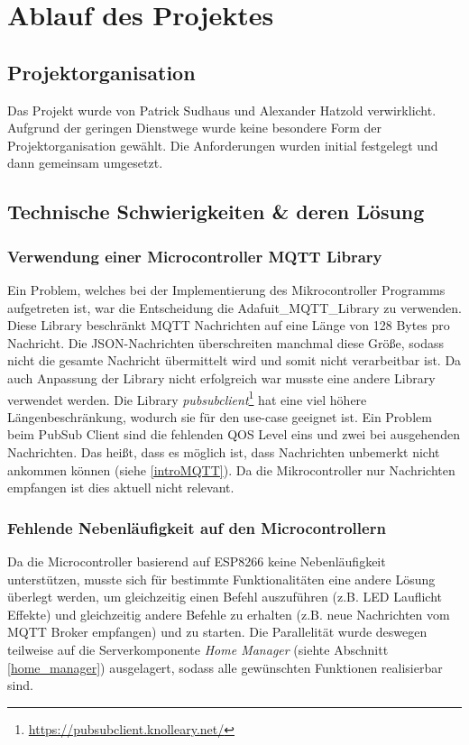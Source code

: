 \chapter{Ablauf des Projektes}

\section{Projektorganisation}
Das Projekt wurde von Patrick Sudhaus und Alexander Hatzold verwirklicht. Aufgrund der geringen Dienstwege wurde keine besondere Form der Projektorganisation gewählt. Die Anforderungen wurden initial festgelegt und dann gemeinsam umgesetzt.

\section{Technische Schwierigkeiten \& deren Lösung}

\subsection{Verwendung einer Microcontroller MQTT Library}
Ein Problem, welches bei der Implementierung des Mikrocontroller Programms aufgetreten ist, war die Entscheidung die Adafuit\_MQTT\_Library zu verwenden. Diese Library beschränkt MQTT Nachrichten auf eine Länge von 128 Bytes pro Nachricht. Die JSON-Nachrichten überschreiten manchmal diese Größe, sodass nicht die gesamte Nachricht übermittelt wird und somit nicht verarbeitbar ist. Da auch Anpassung der Library nicht erfolgreich war musste eine andere Library verwendet werden. Die Library \textit{pubsubclient}\footnote{\url{https://pubsubclient.knolleary.net/}} hat eine viel höhere Längenbeschränkung, wodurch sie für den use-case geeignet ist. Ein Problem beim PubSub Client sind die fehlenden QOS Level eins und zwei bei ausgehenden Nachrichten. Das heißt, dass es möglich ist, dass Nachrichten unbemerkt nicht ankommen können (siehe \ref{introMQTT}). Da die Mikrocontroller nur Nachrichten empfangen ist dies aktuell nicht relevant.

\subsection{Fehlende Nebenläufigkeit auf den Microcontrollern}
Da die Microcontroller basierend auf ESP8266 keine Nebenläufigkeit unterstützen, musste sich für bestimmte Funktionalitäten eine andere Lösung überlegt werden, um gleichzeitig einen Befehl auszuführen (z.B. LED Lauflicht Effekte) und gleichzeitig andere Befehle zu erhalten (z.B. neue Nachrichten vom MQTT Broker empfangen) und zu starten. Die Parallelität wurde deswegen teilweise auf die Serverkomponente \textit{Home Manager} (siehte Abschnitt \ref{home_manager}) ausgelagert, sodass alle gewünschten Funktionen realisierbar sind.